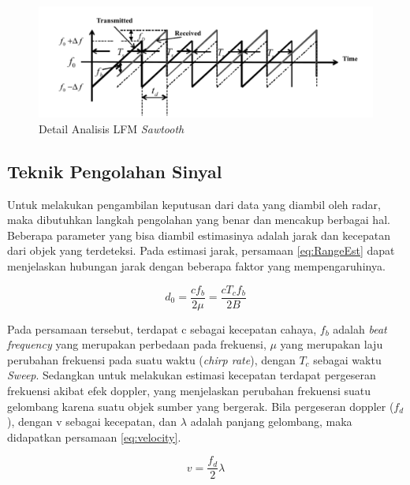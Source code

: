 \begin{figure}
	\begin{center}
		\includegraphics[scale=0.65]{pics/bab2/lfmDetail.png}
		\caption[Detail Analisis LFM \textit{Sawtooth}]{Detail Analisis LFM \textit{Sawtooth} \cite{Jankiraman2018}}
		\label{pic:lfmDetail}
	\end{center}
\end{figure}


\subsection{Teknik Pengolahan Sinyal}
Untuk melakukan pengambilan keputusan dari data yang diambil oleh radar, maka dibutuhkan langkah pengolahan yang benar dan mencakup berbagai hal. Beberapa parameter yang bisa diambil estimasinya adalah jarak dan kecepatan dari objek yang terdeteksi. Pada estimasi jarak, persamaan \ref{eq:RangeEst} dapat menjelaskan hubungan jarak dengan beberapa faktor yang mempengaruhinya.

\begin{equation}
	d_{0} = \frac{c f_{b}}{2 \mu} = \frac{c T_{c} f_{b}}{2 B}
	\label{eq:RangeEst}
\end{equation}

Pada persamaan tersebut, terdapat c sebagai kecepatan cahaya, $f_{b}$ adalah \textit{beat frequency} yang merupakan perbedaan pada frekuensi,  $\mu$ yang merupakan laju perubahan frekuensi pada suatu waktu (\textit{chirp rate}), dengan $T_{c}$ sebagai waktu \textit{Sweep}. Sedangkan untuk melakukan estimasi kecepatan terdapat pergeseran frekuensi akibat efek doppler, yang menjelaskan perubahan frekuensi suatu gelombang karena suatu objek sumber yang bergerak. Bila pergeseran doppler ($f_{d}$), dengan v sebagai kecepatan, dan $\lambda$ adalah panjang gelombang, maka didapatkan persamaan \ref{eq:velocity}.

\begin{equation}
	v = \frac{f_{d}}{2}\lambda
	\label{eq:velocity}
\end{equation}

